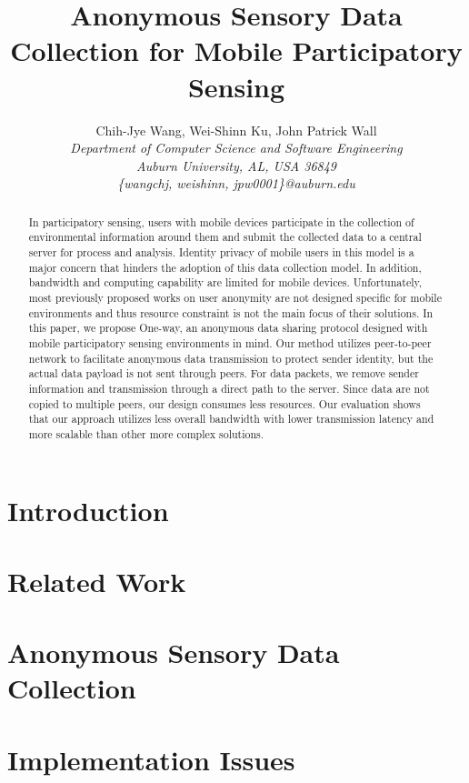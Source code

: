 \documentclass[10pt,conference,letterpaper]{IEEEtran}
\title{Anonymous Sensory Data Collection for Mobile Participatory Sensing}
\author{
Chih-Jye Wang, Wei-Shinn Ku, John Patrick Wall
\vspace{1.6mm}\\
\fontsize{10}{10}\selectfont\itshape
Department of Computer Science and Software Engineering\\
Auburn University, AL, USA 36849\\
\fontsize{9}{9}\selectfont\ttfamily\upshape
\{wangchj, weishinn, jpw0001\}@auburn.edu\\
}
\begin{document}
\maketitle

\begin{abstract}
In participatory sensing, users with mobile devices participate in
the collection of environmental information around them and submit
the collected data to a central server for process and analysis.
Identity privacy of mobile users in this model is a major concern
that hinders the adoption of this data collection model. In
addition, bandwidth and computing capability are limited for
mobile devices. Unfortunately, most previously proposed works on
user anonymity are not designed specific for mobile environments
and thus resource constraint is not the main focus of their
solutions. In this paper, we propose One-way, an anonymous data
sharing protocol designed with mobile participatory sensing
environments in mind. Our method utilizes peer-to-peer network to
facilitate anonymous data transmission to protect sender identity,
but the actual data payload is not sent through peers. For data
packets, we remove sender information and transmission through a
direct path to the server. Since data are not copied to multiple
peers, our design consumes less resources. Our evaluation shows
that our approach utilizes less overall bandwidth with lower
transmission latency and more scalable than other more complex
solutions.
\end{abstract}


\section{Introduction}\label{sec-intro}


\section{Related Work}\label{sec-related-works}


\section{Anonymous Sensory Data Collection}\label{sec-protocol}


\section{Implementation Issues}\label{sec-imp}

\end{document}
